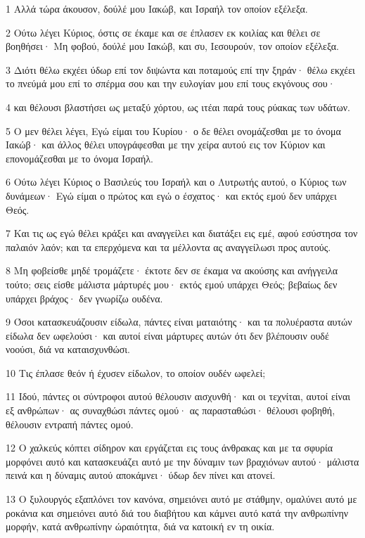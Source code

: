 \par 1 Αλλά τώρα άκουσον, δούλέ μου Ιακώβ, και Ισραήλ τον οποίον εξέλεξα.
\par 2 Ούτω λέγει Κύριος, όστις σε έκαμε και σε έπλασεν εκ κοιλίας και θέλει σε βοηθήσει· Μη φοβού, δούλέ μου Ιακώβ, και συ, Ιεσουρούν, τον οποίον εξέλεξα.
\par 3 Διότι θέλω εκχέει ύδωρ επί τον διψώντα και ποταμούς επί την ξηράν· θέλω εκχέει το πνεύμά μου επί το σπέρμα σου και την ευλογίαν μου επί τους εκγόνους σου·
\par 4 και θέλουσι βλαστήσει ως μεταξύ χόρτου, ως ιτέαι παρά τους ρύακας των υδάτων.
\par 5 Ο μεν θέλει λέγει, Εγώ είμαι του Κυρίου· ο δε θέλει ονομάζεσθαι με το όνομα Ιακώβ· και άλλος θέλει υπογράφεσθαι με την χείρα αυτού εις τον Κύριον και επονομάζεσθαι με το όνομα Ισραήλ.
\par 6 Ούτω λέγει Κύριος ο Βασιλεύς του Ισραήλ και ο Λυτρωτής αυτού, ο Κύριος των δυνάμεων· Εγώ είμαι ο πρώτος και εγώ ο έσχατος· και εκτός εμού δεν υπάρχει Θεός.
\par 7 Και τις ως εγώ θέλει κράξει και αναγγείλει και διατάξει εις εμέ, αφού εσύστησα τον παλαιόν λαόν; και τα επερχόμενα και τα μέλλοντα ας αναγγείλωσι προς αυτούς.
\par 8 Μη φοβείσθε μηδέ τρομάζετε· έκτοτε δεν σε έκαμα να ακούσης και ανήγγειλα τούτο; σεις είσθε μάλιστα μάρτυρές μου· εκτός εμού υπάρχει Θεός; βεβαίως δεν υπάρχει βράχος· δεν γνωρίζω ουδένα.
\par 9 Όσοι κατασκευάζουσιν είδωλα, πάντες είναι ματαιότης· και τα πολυέραστα αυτών είδωλα δεν ωφελούσι· και αυτοί είναι μάρτυρες αυτών ότι δεν βλέπουσιν ουδέ νοούσι, διά να καταισχυνθώσι.
\par 10 Τις έπλασε θεόν ή έχυσεν είδωλον, το οποίον ουδέν ωφελεί;
\par 11 Ιδού, πάντες οι σύντροφοι αυτού θέλουσιν αισχυνθή· και οι τεχνίται, αυτοί είναι εξ ανθρώπων· ας συναχθώσι πάντες ομού· ας παρασταθώσι· θέλουσι φοβηθή, θέλουσιν εντραπή πάντες ομού.
\par 12 Ο χαλκεύς κόπτει σίδηρον και εργάζεται εις τους άνθρακας και με τα σφυρία μορφόνει αυτό και κατασκευάζει αυτό με την δύναμιν των βραχιόνων αυτού· μάλιστα πεινά και η δύναμις αυτού αποκάμνει· ύδωρ δεν πίνει και ατονεί.
\par 13 Ο ξυλουργός εξαπλόνει τον κανόνα, σημειόνει αυτό με στάθμην, ομαλύνει αυτό με ροκάνια και σημειόνει αυτό διά του διαβήτου και κάμνει αυτό κατά την ανθρωπίνην μορφήν, κατά ανθρωπίνην ώραιότητα, διά να κατοική εν τη οικία.
